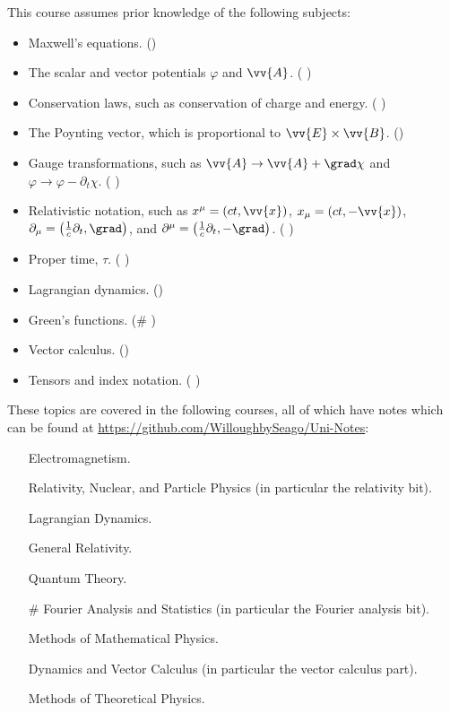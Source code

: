 This course assumes prior knowledge of the following subjects:
\begin{itemize}
    \item Maxwell's equations. (\textasteriskcentered{})
    \item The scalar and vector potentials \(\varphi\) and \(\vv{A}\). (\textasteriskcentered{} \textsection{})
    \item Conservation laws, such as  conservation of charge and energy. (\textasteriskcentered{} \textsection{})
    \item The Poynting vector, which is proportional to \(\vv{E} \times \vv{B}\). (\textasteriskcentered{})
    \item Gauge transformations, such as \(\vv{A} \to \vv{A} + \grad\chi\) and \(\varphi \to \varphi - \partial_t\chi\). (\textasteriskcentered{} \textparagraph{} \textbardbl{})
    \item Relativistic notation, such as \(x^\mu = (ct, \vv{x})\), \(x_\mu = (ct, -\vv{x})\), \(\partial_\mu = \left( \tfrac{1}{c}\partial_t, \grad \right)\), and \(\partial^\mu = \left( \tfrac{1}{c}\partial_t, -\grad \right)\). (\textdagger{} \textparagraph{} \textbardbl{})
    \item Proper time, \(\tau\). (\textdagger{} \textparagraph{})
    \item Lagrangian dynamics. (\textsection)
    \item Green's functions. (\# \textblank)
    \item Vector calculus. (\textlnot)
    \item Tensors and index notation. (\textlnot{} \textexclamdown{} \textparagraph{})
\end{itemize}
These topics are covered in the following courses, all of which have notes which can be found at \url{https://github.com/WilloughbySeago/Uni-Notes}:
\begin{itemize}
    \item[\textasteriskcentered] Electromagnetism.
    \item[\textdagger] Relativity, Nuclear, and Particle Physics (in particular the relativity bit).
    \item[\textsection] Lagrangian Dynamics.
    \item[\textparagraph] General Relativity.
    \item[\textbardbl] Quantum Theory.
    \item[\#] Fourier Analysis and Statistics (in particular the Fourier analysis bit).
    \item[\textblank] Methods of Mathematical Physics.
    \item[\textlnot] Dynamics and Vector Calculus (in particular the vector calculus part).
    \item[\textexclamdown] Methods of Theoretical Physics.
\end{itemize}

